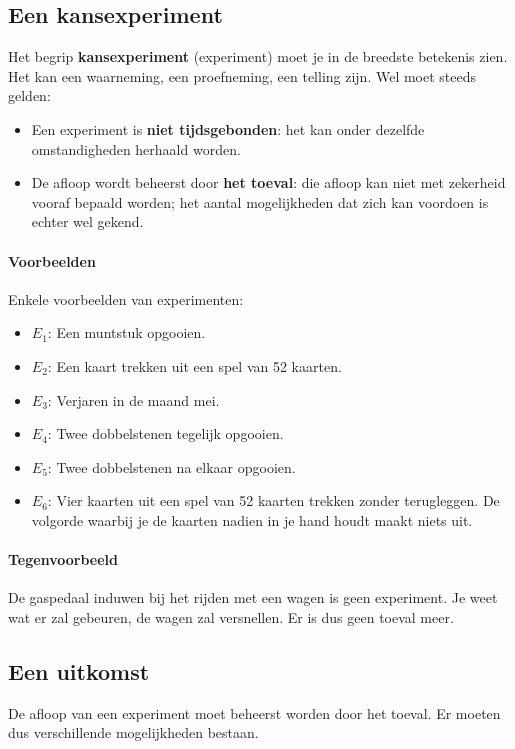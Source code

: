 \documentclass[12pt,twoside]{article}
\begin{document}
\subsection{Een kansexperiment}

Het begrip {\bf kansexperiment} (experiment) moet je in de breedste betekenis zien. Het kan een
waarneming, een proefneming, een telling zijn. Wel moet steeds gelden:
\begin{itemize}
  \item Een experiment is {\bf niet tijdsgebonden}: het kan onder dezelfde omstandigheden
herhaald worden.
  \item De afloop wordt beheerst door {\bf het toeval}: die afloop kan niet met zekerheid
vooraf bepaald worden; het aantal mogelijkheden dat zich kan voordoen is
echter wel gekend.
\end{itemize}

\paragraph*{Voorbeelden} Enkele voorbeelden van experimenten:
\begin{itemize}
  \item $E_1$: Een muntstuk opgooien.
  \item $E_2$: Een kaart trekken uit een spel van 52 kaarten.
  \item $E_3$: Verjaren in de maand mei.
  \item $E_4$: Twee dobbelstenen tegelijk opgooien.
  \item $E_5$: Twee dobbelstenen na elkaar opgooien.
  \item $E_6$: Vier kaarten uit een spel van 52 kaarten trekken zonder terugleggen. De volgorde waarbij je de kaarten nadien in je hand houdt maakt niets uit.
\end{itemize}

\paragraph*{Tegenvoorbeeld}
De gaspedaal induwen bij het rijden met een wagen is geen experiment. Je weet wat er zal gebeuren, de wagen zal versnellen. Er is dus geen toeval meer.


\subsection{Een uitkomst}

De afloop van een experiment moet beheerst worden door het toeval. Er moeten dus verschillende mogelijkheden bestaan.
\end{document}

